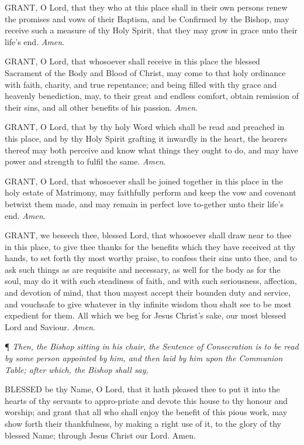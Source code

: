 GRANT,
O Lord, that they who at this place shall in their own persons renew
the promises and vows of their Baptism, and be Confirmed by the Bishop,
may receive such a measure of thy Holy Spirit, that they may grow in
grace unto their life's end. \emph{Amen}.

GRANT,
O Lord, that whosoever shall receive in this place the blessed Sacrament
of the Body and Blood of Christ, may come to that holy ordinance with
faith, charity, and true repentance; and being filled with thy grace
and heavenly benediction, may, to their great and endless comfort, obtain
remission of their sins, and all other benefits of his passion. \emph{Amen}.

GRANT,
O Lord, that by thy holy Word which shall be read and preached in this
place, and by thy Holy Spirit grafting it inwardly in the heart, the
hearers thereof may both perceive and know what things they ought to
do, and may have power and strength to fulfil the same. \emph{Amen}.

GRANT, O Lord, that whosoever shall be
joined together in this place in the holy estate of Matrimony, may faithfully
perform and keep the vow and covenant betwixt them made, and may remain
in perfect love to-gether unto their life's end. \emph{Amen}.

GRANT, we beseech thee, blessed Lord,
that whosoever shall draw near to thee in this place, to give thee thanks
for the benefits which they have received at thy hands, to set forth
thy most worthy praise, to confess their sins unto thee, and to ask
such things as are requisite and necessary, as well for the body as
for the soul, may do it with such steadiness of faith, and with such
seriousness, affection, and devotion of mind, that thou mayest accept
their bounden duty and service, and vouchsafe to give whatever in thy
infinite wisdom thou shalt see to be most expedient for them. All which
we beg for Jesus Christ's sake, our most blessed Lord and Saviour. \emph{Amen}.

¶
\emph{Then, the Bishop sitting in his chair, the Sentence of Consecration
is to be read by some person appointed by him, and then laid by him
upon the Communion Table; after which, the Bishop shall say,}

BLESSED
be thy Name, O Lord, that it hath pleased thee to put it into the hearts
of thy servants to appro-priate and devote this house to thy honour
and worship; and grant that all who shall enjoy the benefit of this
pious work, may show forth their thankfulness, by making a right use
of it, to the glory of thy blessed Name; through Jesus Christ our Lord.
Amen.

